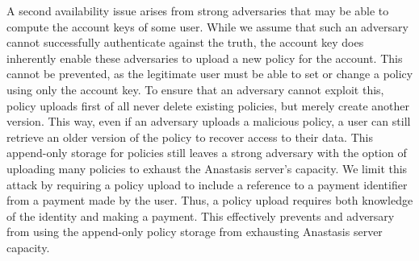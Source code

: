 A second availability issue arises from strong adversaries that may be
able to compute the account keys of some user. While we assume that
such an adversary cannot successfully authenticate against the truth,
the account key does inherently enable these adversaries to upload a
new policy for the account. This cannot be prevented, as the
legitimate user must be able to set or change a policy using only the
account key. To ensure that an adversary cannot exploit this, policy
uploads first of all never delete existing policies, but merely create
another version. This way, even if an adversary uploads a malicious
policy, a user can still retrieve an older version of the policy to
recover access to their data. This append-only storage for policies
still leaves a strong adversary with the option of uploading many
policies to exhaust the Anastasis server’s capacity. We limit this
attack by requiring a policy upload to include a reference to a
payment identifier from a payment made by the user. Thus, a policy
upload requires both knowledge of the identity and making a
payment. This effectively prevents and adversary from using the
append-only policy storage from exhausting Anastasis server capacity.
